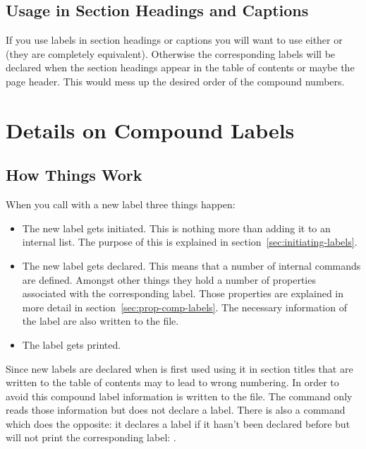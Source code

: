 \documentclass[load-preamble+,babel-options={ngerman,british,american}]{cnltx-doc}
\begin{document}
\subsection{Usage in Section Headings and Captions}\label{sec:usage-sect-head}
If you use labels in section headings or captions you will want to use either
 or \code{+} (they are completely equivalent).  Otherwise
the corresponding labels will be declared when the section headings appear in
the table of contents or maybe the page header.  This would mess up the
desired order of the compound numbers.

\section{Details on Compound Labels}\label{sec:deta-comp-labels}
\subsection{How Things Work}\label{sec:how-things-work}

When you call  with a new label three things happen:
\begin{itemize}
  \item The new label gets initiated.  This is nothing more than adding it to
    an internal list.  The purpose of this is explained in
    section~\ref{sec:initiating-labels}.
  \item The new label gets declared.  This means that a number of internal
    commands are defined.  Amongst other things they hold a number of
    properties associated with the corresponding label.  Those properties are
    explained in more detail in section~\ref{sec:prop-comp-labels}.  The
    necessary information of the label are also written to the 
    file.
  \item The label gets printed.
\end{itemize}

Since new labels are declared when  is first used using it in section
titles that are written to the table of contents may to lead to wrong
numbering.  In order to avoid this compound label information is written to
the  file.  The command 
only reads those information but does not declare a label.  There is also a
command which does the opposite: it declares a label if it hasn't been
declared before but will not print the corresponding label:
.
\end{document}

